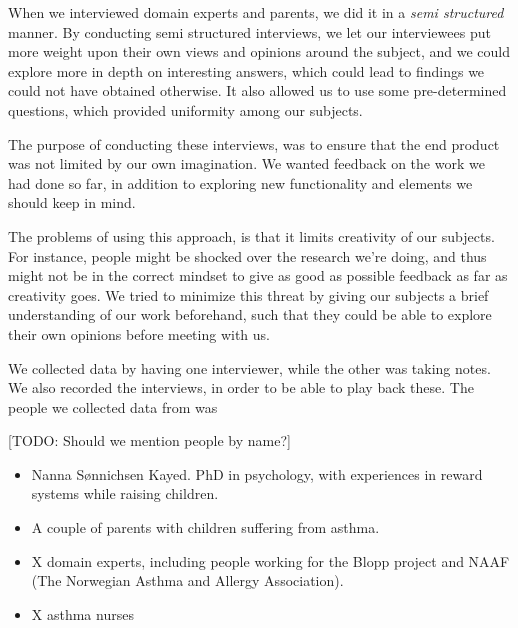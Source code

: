 When we interviewed domain experts and parents, we did it in a \emph{semi structured} manner. By conducting semi structured interviews, we let our interviewees put more weight upon their own views and opinions around the subject, and we could explore more in depth on interesting answers, which could lead to findings we could not have obtained otherwise. It also allowed us to use some pre-determined questions, which provided uniformity among our subjects.

The purpose of conducting these interviews, was to ensure that the end product was not limited by our own imagination. We wanted feedback on the work we had done so far, in addition to exploring new functionality and elements we should keep in mind. 

The problems of using this approach, is that it limits creativity of our subjects. For instance, people might be shocked over the research we're doing, and thus might not be in the correct mindset to give as good as possible feedback as far as creativity goes. We tried to minimize this threat by giving our subjects a brief understanding of our work beforehand, such that they could be able to explore their own opinions before meeting with us.

We collected data by having one interviewer, while the other was taking notes. We also recorded the interviews, in order to be able to play back these. The people we collected data from was

[TODO: Should we mention people by name?]
\begin{itemize}
  \item Nanna S\o nnichsen Kayed. PhD in psychology, with experiences in reward systems while raising children.  
  \item A couple of parents with children suffering from asthma. 
  \item X domain experts, including people working for the Blopp project and NAAF (The Norwegian Asthma and Allergy Association).  
  \item X asthma nurses
\end{itemize} 

